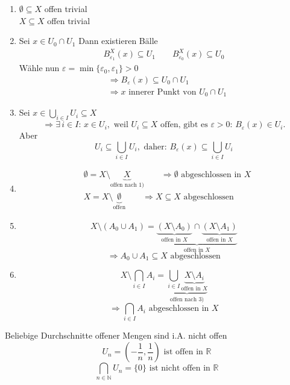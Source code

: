 \begin{enumerate}
	\item $\emptyset \subseteq X$ offen trivial \\
		$X \subseteq  X$ offen trivial
	\item Sei $x \in U_0 \cap U_1$ Dann existieren Bälle
	\begin{align*}
		B_{\varepsilon_1}^X(x) \subseteq U_1 \qquad B_{\varepsilon_0}^X(x) \subseteq U_0
	\end{align*}
Wähle nun $\varepsilon= \min \{ \varepsilon_0, \varepsilon_1 \} > 0$
\begin{align*}
	& \Rightarrow B_{\varepsilon}(x) \subseteq U_0 \cap U_1 \\
	& \Rightarrow x \text{ innerer Punkt von } U_0 \cap U_1
\end{align*}
	\item Sei $x \in \bigcup\limits_{i \in I}U_i \subseteq X$
	\[
		\Rightarrow \exists\,i \in I:\, x \in U_i, \text{ weil } U_i \subseteq X \text{ offen, gibt es } \varepsilon>0: \, B_{\varepsilon}(x) \in U_i.
	\]
Aber \[
	U_i \subseteq \bigcup\limits_{i \in I}U_i, \text{ daher: } B_{\varepsilon}(x) \subseteq \bigcup\limits_{i \in I}U_i
	\]
	\item \begin{align*}
		&\emptyset = X \setminus \underset{\text{offen nach 1)}}{\underbrace{X}} \qquad \Rightarrow \emptyset \text{ abgeschlossen in } X \\
		&X = X \setminus \underset{\text{offen}}{\underbrace{\emptyset}} \qquad \Rightarrow X \subseteq X \text{ abgeschlossen}
	\end{align*}
	\item \[
		X \setminus(A_0 \cup A_1)= \underset{\text{offen in $X$}}{\underbrace{\underset{\text{offen in $X$}}{\underbrace{(X \setminus A_0)}}\cap \underset{\text{offen in $X$}}{\underbrace{(X \setminus A_1)}}}}
	\]
	\[
		\Rightarrow A_0 \cup A_1 \subseteq X \text{ abgeschlossen}
	\]
	\item \[
		X \setminus \bigcap\limits_{i \in I}A_i = \underset{\text{offen nach 3)}}{\underbrace{\bigcup\limits_{i \in I}\underset{\text{offen in $X$}}{\underbrace{X \setminus A_i}}}}
	\]
	\[
		\Rightarrow \bigcap\limits_{i \in I}A_i \text{ abgeschlossen in } X
	\]
\end{enumerate}
Beliebige Durchschnitte offener Mengen sind i.A. nicht offen 
\[
	U_n = (-\frac{1}{n},\frac{1}{n}) \text{ ist offen in } \mathbb{R}
\]
\[
	\bigcap\limits_{n \in \mathbb{N}}U_n = \{0\} \text{ ist nicht offen in } \mathbb{R}
\]

